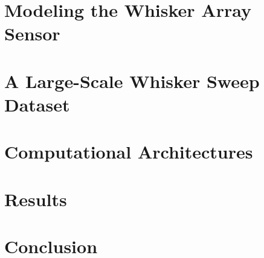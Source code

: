 \documentclass{article}
\begin{document}
\section{Modeling the Whisker Array Sensor} %
\vspace{-4mm}

\vspace{-3mm}
\section{A Large-Scale Whisker Sweep Dataset} %
\vspace{-4mm}

\vspace{-3mm}
\section{Computational Architectures} %
\vspace{-4mm}

\vspace{-3mm}
\section{Results} %
\vspace{-4mm}

\vspace{-3mm}
\section{Conclusion}  %
\vspace{-4mm}



{\small
}

\end{document}
